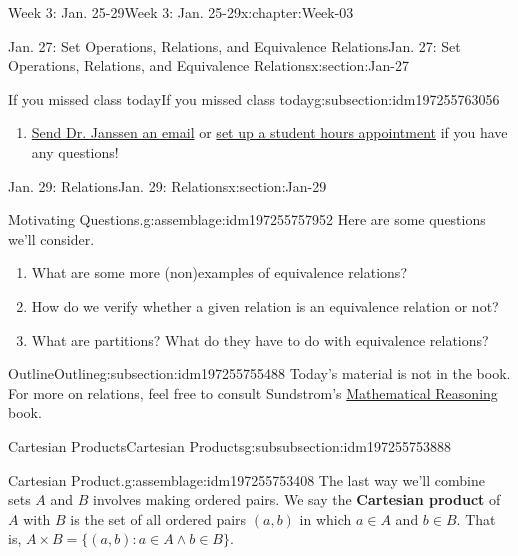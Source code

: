 \documentclass[oneside,10pt,]{book}
\newcommand{\terminology}[1]{\textbf{#1}}
\numberwithin{equation}{section}
\newcommand{\st}{:}
\begin{document}
\begin{chapterptx}{Week 3: Jan. 25-29}{}{Week 3: Jan. 25-29}{}{}{x:chapter:Week-03}
\begin{sectionptx}{Jan. 27: Set Operations, Relations, and Equivalence Relations}{}{Jan. 27: Set Operations, Relations, and Equivalence Relations}{}{}{x:section:Jan-27}
\begin{subsectionptx}{If you missed class today}{}{If you missed class today}{}{}{g:subsection:idm197255763056}
\begin{enumerate}
\item{}\href{mailto:mike.janssen@dordt.edu}{Send Dr. Janssen an email} or \href{https://calendly.com/mkjanssen/student-hours}{set up a student hours appointment} if you have any questions!%
\end{enumerate}
\end{subsectionptx}
\end{sectionptx}
%
%
\typeout{************************************************}
\typeout{************************************************}
%
\begin{sectionptx}{Jan. 29: Relations}{}{Jan. 29: Relations}{}{}{x:section:Jan-29}
\begin{introduction}{}%
\begin{assemblage}{Motivating Questions.}{g:assemblage:idm197255757952}%
Here are some questions we'll consider. %
\begin{enumerate}
\item{}What are some more (non)examples of equivalence relations?%
\item{}How do we verify whether a given relation is an equivalence relation or not?%
\item{}What are partitions? What do they have to do with equivalence relations?%
\end{enumerate}
%
\end{assemblage}
\end{introduction}%
%
%
\typeout{************************************************}
\typeout{************************************************}
%
\begin{subsectionptx}{Outline}{}{Outline}{}{}{g:subsection:idm197255755488}
Today's material is not in the book. For more on relations, feel free to consult Sundstrom's \href{https://www.tedsundstrom.com/mathematical-reasoning-3}{Mathematical Reasoning} book.%
%
%
\typeout{************************************************}
\typeout{************************************************}
%
\begin{subsubsectionptx}{Cartesian Products}{}{Cartesian Products}{}{}{g:subsubsection:idm197255753888}
\begin{assemblage}{Cartesian Product.}{g:assemblage:idm197255753408}%
The last way we'll combine sets \(A\) and \(B\) involves making ordered pairs. We say the \terminology{Cartesian product} of \(A\) with \(B\) is the set of all ordered pairs \((a,b)\) in which \(a\in A\) and \(b\in B\). That is, \(A \times B = \{(a,b) \st a \in A \wedge b \in B\}\).%

\end{assemblage}
\end{subsubsectionptx}
\end{subsectionptx}
\end{sectionptx}
\end{chapterptx}
\end{document}
